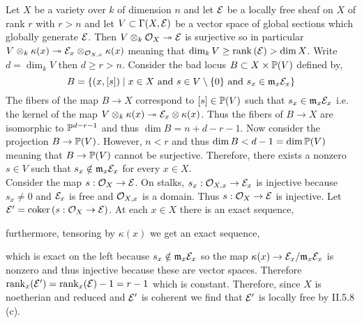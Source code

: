 \documentclass[12pt]{article}
\begin{document}
Let $X$ be a variety over $k$ of dimension $n$ and let $\E$ be a locally free sheaf on $X$ of rank $r$ with $r > n$ and let $V \subset \Gamma(X, \E)$ be a vector space of global sections which globally generate $\E$. Then $V \otimes_k \struct{X} \onto \E$ is surjective so in particular $V \otimes_k \kappa(x) \onto \E_x \otimes_{\stalk{X}{x}} \kappa(x)$ meaning that $\dim_k{V} \ge \rank{(\E)} > \dim{X}$. Write $d = \dim_k{V}$ then $d \ge r > n$. 
Consider the bad locus $B \subset X \times \P(V)$ defined by,
\[ B = \{ (x, [s]) \mid x \in X \text{ and } s \in V \setminus \{ 0 \} \text{ and } s_x \in \m_x \E_x \} \]
The fibers of the map $B \to X$ correspond to $[s] \in \P(V)$ such that $s_x \in \m_x \E_x$ i.e. the kernel of the map $V \otimes_k \kappa(x) \onto \E_x \otimes \kappa(x)$. Thus the fibers of $B \to X$ are isomorphic to $\P^{d - r - 1}$ and thus $\dim{B} = n + d - r - 1$. Now consider the projection $B \to \P(V)$. However,  $n < r$ and thus $\dim{B} < d - 1 = \dim{\P(V)}$ meaning that $B \to \P(V)$ cannot be surjective. Therefore, there exists a nonzero $s \in V$ such that $s_x \notin \m_x \E_x$ for every $x \in X$.
\bigskip\\
Consider the map $s : \struct{X} \to \E$. On stalks, $s_x : \stalk{X}{x} \to \E_x$ is injective because $s_x \neq 0$ and $\E_x$ is free and $\stalk{X}{x}$ is a domain. Thus $s : \struct{X} \to \E$ is injective. Let $\E' = \coker{(s : \struct{X} \to \E)}$. At each $x \in X$ there is an exact sequence,
\begin{center}
\end{center}
furthermore, tensoring by $\kappa(x)$ we get an exact sequence,
\begin{center}
\end{center}
which is exact on the left because $s_x \notin \m_x \E_x$ so the map $\kappa(x) \to \E_x / \m_x \E_x$ is nonzero and thus injective because these are vector spaces. Therefore $\rank_x(\E') = \rank_x(\E) - 1 = r - 1$ which is constant. Therefore, since $X$ is noetherian and reduced and $\E'$ is coherent we find that $\E'$ is locally free by II.5.8 (c).
\end{document}
